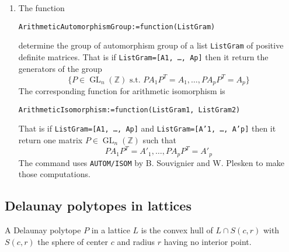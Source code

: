 \documentclass[12pt]{amsart}
\newcommand{\ZZ}{\ensuremath{\mathbb{Z}}}
\DeclareMathOperator{\GL}{GL}
\begin{document}
\begin{enumerate}
\item The function
\begin{verbatim}
ArithmeticAutomorphismGroup:=function(ListGram)
\end{verbatim}
determine the group of automorphism group of a list {\tt ListGram} of positive definite matrices.
That is if {\tt ListGram=[A1, \dots, Ap]} then it return the generators of the group
\begin{equation*}
\{P \in \GL_n(\ZZ) \mbox{~s.t.~} PA_1 P^T = A_1, \dots, PA_p P^T = A_p\}
\end{equation*}
The corresponding function for arithmetic isomorphism is 
\begin{verbatim}
ArithmeticIsomorphism:=function(ListGram1, ListGram2)
\end{verbatim}
That is if {\tt ListGram=[A1, \dots, Ap]} and {\tt ListGram=[A'1, \dots, A'p]} then it return one matrix $P\in \GL_n(\ZZ)$ such that
\begin{equation*}
P A_1 P^T = A'_1, \dots, P A_p P^T = A'_p
\end{equation*}
The command uses {\tt AUTOM/ISOM} by B. Souvignier and W. Plesken to make those computations.
\end{enumerate}






\subsection{Delaunay polytopes in lattices}

A Delaunay polytope $P$ in a lattice $L$ is the convex hull
of $L\cap S(c,r)$ with $S(c,r)$ the sphere of center $c$
and radius $r$ having no interior point.
\end{document}
